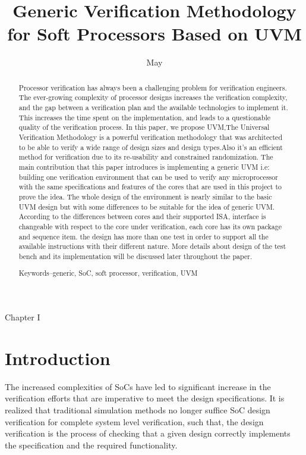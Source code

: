 \documentclass[conference,10 pt,twoside]{IEEEtran}
\date{May}
\begin{document}
\title{Generic Verification Methodology for Soft Processors Based on UVM}
\twocolumn
\maketitle


\begin{abstract}
Processor verification has always been a challenging problem for verification engineers. The ever-growing complexity of processor designs increases the verification complexity, and the gap between a verification plan and the available technologies to implement it. This increases the time spent on the implementation, and leads to a questionable quality of the verification process.
In this paper, we propose UVM,The Universal Verification Methodology is a powerful verification methodology that was architected to be able to verify a wide range of design sizes and design types.Also it's an efficient method for verification due to its re-usability and constrained randomization. The main contribution that this paper introduces is implementing a generic UVM i.e: building one verification environment that can be used to verify any microprocessor with the same specifications and features of the cores that are used in this project to prove the idea. The whole design of the environment is nearly similar to the basic UVM design but with some differences to be suitable for the idea of generic UVM. According to the differences between cores and their supported ISA, interface is changeable with respect to the core under verification, each core has its own package and sequence item. the design has more than one test in order to support all the available instructions with their different nature. More details about design of the test bench and its implementation will be discussed later throughout the paper.


Keywords--generic, SoC, soft processor, verification, UVM
\end{abstract}
Chapter I
\section{Introduction}
     The increased complexities of SoCs have led to significant increase in the verification efforts that are imperative to meet the design specifications. It is realized that traditional simulation methods no longer suffice SoC design verification for complete system level verification, such that, the design verification is the process of checking that a given design correctly implements the specification and the required functionality\cite{b1}.
\end{document}
